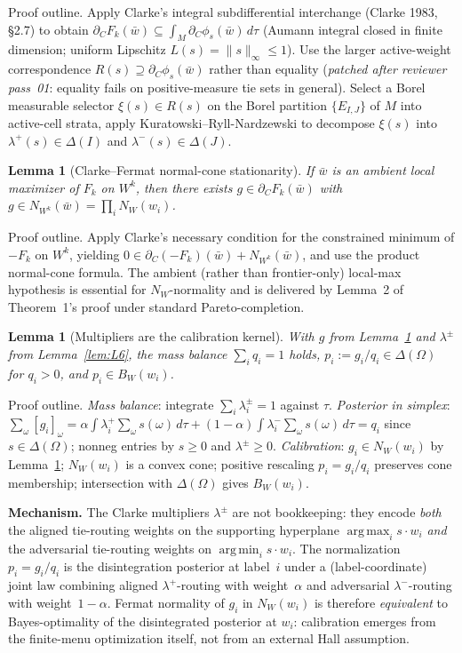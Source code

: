 \documentclass[11pt]{article}
\newtheorem{lemma}[theorem]{Lemma}
\theoremstyle{definition}
\theoremstyle{remark}
\newcommand{\Om}{\Omega}
\newcommand{\argmin}{\operatorname*{arg\,min}}
\newcommand{\argmax}{\operatorname*{arg\,max}}
\begin{document}
\noindent Proof outline. Apply Clarke's integral subdifferential
interchange (Clarke 1983, \S2.7) to obtain
$\partial_C F_k(\bar w)\subseteq\int_M\partial_C\phi_s(\bar w)\,d\tau$
(Aumann integral closed in finite dimension; uniform Lipschitz
$L(s)=\|s\|_\infty\le 1$). Use the larger active-weight correspondence
$R(s)\supseteq\partial_C\phi_s(\bar w)$ rather than equality
(\emph{patched after reviewer pass~01}: equality fails on positive-measure
tie sets in general). Select a Borel measurable selector
$\xi(s)\in R(s)$ on the Borel partition $\{E_{I,J}\}$ of $M$ into
active-cell strata, apply Kuratowski--Ryll-Nardzewski to decompose
$\xi(s)$ into $\lambda^+(s)\in\Delta(I)$ and $\lambda^-(s)\in\Delta(J)$.

\begin{lemma}[Clarke--Fermat normal-cone stationarity]\label{lem:L7}
If $\bar w$ is an ambient local maximizer of $F_k$ on $W^k$, then there
exists $g\in\partial_C F_k(\bar w)$ with $g\in N_{W^k}(\bar w) = \prod_i N_W(w_i)$.
\end{lemma}

\noindent Proof outline. Apply Clarke's necessary condition for the
constrained minimum of $-F_k$ on $W^k$, yielding
$0\in\partial_C(-F_k)(\bar w) + N_{W^k}(\bar w)$, and use the product
normal-cone formula. The ambient (rather than frontier-only) local-max
hypothesis is essential for $N_W$-normality and is delivered by Lemma~2
of Theorem~1's proof under standard Pareto-completion.

\begin{lemma}[Multipliers are the calibration kernel]\label{lem:L8}
With $g$ from Lemma~\ref{lem:L7} and $\lambda^\pm$ from Lemma~\ref{lem:L6},
the mass balance $\sum_i q_i = 1$ holds, $p_i := g_i/q_i\in\Delta(\Om)$
for $q_i>0$, and $p_i\in B_W(w_i)$.
\end{lemma}

\noindent Proof outline. \emph{Mass balance}: integrate
$\sum_i\lambda^\pm_i = 1$ against $\tau$. \emph{Posterior in simplex}:
$\sum_\omega[g_i]_\omega = \alpha\!\int\lambda^+_i\sum_\omega s(\omega)\,d\tau + (1-\alpha)\!\int\lambda^-_i\sum_\omega s(\omega)\,d\tau = q_i$
since $s\in\Delta(\Om)$; nonneg entries by $s\ge 0$ and $\lambda^\pm\ge 0$.
\emph{Calibration}: $g_i\in N_W(w_i)$ by Lemma~\ref{lem:L7};
$N_W(w_i)$ is a convex cone; positive rescaling $p_i = g_i/q_i$
preserves cone membership; intersection with $\Delta(\Om)$ gives $B_W(w_i)$.

\noindent\textbf{Mechanism.} The Clarke multipliers $\lambda^\pm$ are
not bookkeeping: they encode \emph{both} the aligned tie-routing weights
on the supporting hyperplane $\argmax_i s\!\cdot w_i$ \emph{and} the
adversarial tie-routing weights on $\argmin_i s\!\cdot w_i$. The
normalization $p_i = g_i/q_i$ is the disintegration posterior at
label~$i$ under a (label-coordinate) joint law combining aligned
$\lambda^+$-routing with weight~$\alpha$ and adversarial
$\lambda^-$-routing with weight~$1-\alpha$. Fermat normality of $g_i$
in $N_W(w_i)$ is therefore \emph{equivalent} to Bayes-optimality of the
disintegrated posterior at $w_i$: calibration emerges from the
finite-menu optimization itself, not from an external Hall assumption.
\end{document}
